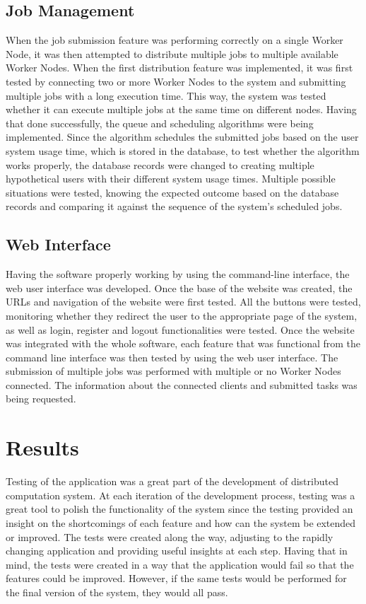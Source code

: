 \documentclass[10pt]{report}
\begin{document}
\subsection*{Job Management}
When the job submission feature was performing correctly on a single Worker Node, it was then attempted to distribute multiple jobs to multiple available Worker Nodes. When the first distribution feature was implemented, it was first tested by connecting two or more Worker Nodes to the system and submitting multiple jobs with a long execution time. This way, the system was tested whether it can execute multiple jobs at the same time on different nodes. Having that done successfully, the queue and scheduling algorithms were being implemented. Since the algorithm schedules the submitted jobs based on the user system usage time, which is stored in the database, to test whether the algorithm works properly, the database records were changed to creating multiple hypothetical users with their different system usage times. Multiple possible situations were tested, knowing the expected outcome based on the database records and comparing it against the sequence of the system's scheduled jobs.

\subsection*{Web Interface}
Having the software properly working by using the command-line interface, the web user interface was developed. Once the base of the website was created, the URLs and navigation of the website were first tested. All the buttons were tested, monitoring whether they redirect the user to the appropriate page of the system, as well as login, register and logout functionalities were tested. Once the website was integrated with the whole software, each feature that was functional from the command line interface was then tested by using the web user interface. The submission of multiple jobs was performed with multiple or no Worker Nodes connected. The information about the connected clients and submitted tasks was being requested.

\section{Results}
Testing of the application was a great part of the development of distributed computation system. At each iteration of the development process, testing was a great tool to polish the functionality of the system since the testing provided an insight on the shortcomings of each feature and how can the system be extended or improved. The tests were created along the way, adjusting to the rapidly changing application and providing useful insights at each step. Having that in mind, the tests were created in a way that the application would fail so that the features could be improved. However, if the same tests would be performed for the final version of the system, they would all pass.
\end{document}
